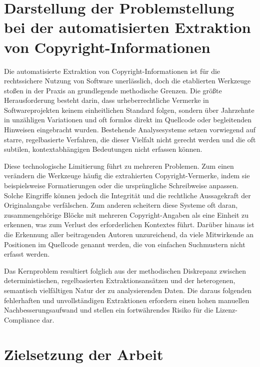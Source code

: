 
\section{Darstellung der Problemstellung bei der automatisierten Extraktion von Copyright-Informationen}\label{sec:problemstellung}

Die automatisierte Extraktion von Copyright-Informationen ist für die rechtssichere Nutzung von Software unerlässlich, doch die etablierten Werkzeuge stoßen in der Praxis an grundlegende methodische Grenzen.
Die größte Herausforderung besteht darin, dass urheberrechtliche Vermerke in Softwareprojekten keinem einheitlichen Standard folgen, sondern über Jahrzehnte in unzähligen Variationen und oft formlos direkt im Quellcode oder begleitenden Hinweisen eingebracht wurden.
Bestehende Analysesysteme setzen vorwiegend auf starre, regelbasierte Verfahren, die dieser Vielfalt nicht gerecht werden und die oft subtilen, kontextabhängigen Bedeutungen nicht erfassen können.

Diese technologische Limitierung führt zu mehreren Problemen.
Zum einen verändern die Werkzeuge häufig die extrahierten Copyright-Vermerke, indem sie beispielsweise Formatierungen oder die ursprüngliche Schreibweise anpassen.
Solche Eingriffe können jedoch die Integrität und die rechtliche Aussagekraft der Originalangabe verfälschen.
Zum anderen scheitern diese Systeme oft daran, zusammengehörige Blöcke mit mehreren Copyright-Angaben als eine Einheit zu erkennen, was zum Verlust des erforderlichen Kontextes führt.
Darüber hinaus ist die Erkennung aller beitragenden Autoren unzureichend, da viele Mitwirkende an Positionen im Quellcode genannt werden, die von einfachen Suchmustern nicht erfasst werden.

Das Kernproblem resultiert folglich aus der methodischen Diskrepanz zwischen deterministischen, regelbasierten Extraktionsansätzen und der heterogenen, semantisch vielfältigen Natur der zu analysierenden Daten.
Die daraus folgenden fehlerhaften und unvollständigen Extraktionen erfordern einen hohen manuellen Nachbesserungsaufwand und stellen ein fortwährendes Risiko für die Lizenz-Compliance dar.


\section{Zielsetzung der Arbeit}\label{sec:zielsetzung}

